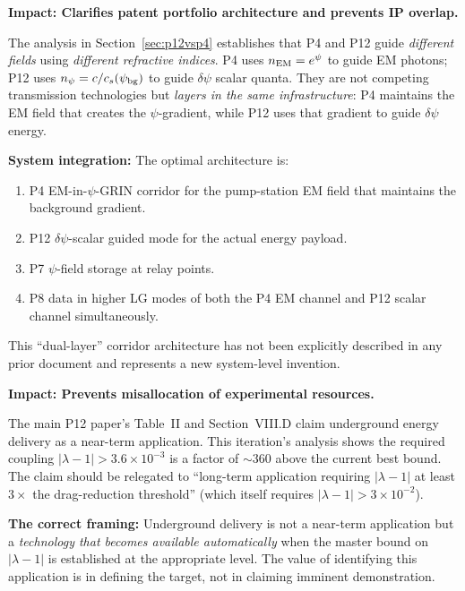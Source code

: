 \documentclass[aps,prd,twocolumn,superscriptaddress]{revtex4-2}
\newcommand{\npsi}{n_\psi}
\begin{document}
\begin{tcolorbox}[colback=red!5!white,colframe=red!75!black,title=
{Finding \#4: P12 and P4 Are Complementary, Not Competing}]
\textbf{Impact: Clarifies patent portfolio architecture and prevents IP overlap.}

The analysis in Section~\ref{sec:p12vsp4} establishes that P4 and P12
guide \emph{different fields} using \emph{different refractive indices}.
P4 uses $n_{\rm EM} = e^\psi$ to guide EM photons; P12 uses $\npsi = c/c_s(\psi_{\rm bg})$
to guide $\delta\psi$ scalar quanta.  They are not competing transmission
technologies but \emph{layers in the same infrastructure}: P4 maintains
the EM field that creates the $\psi$-gradient, while P12 uses that
gradient to guide $\delta\psi$ energy.

\textbf{System integration:}  The optimal architecture is:
\begin{enumerate}
\item P4 EM-in-$\psi$-GRIN corridor for the pump-station EM field that
maintains the background gradient.
\item P12 $\delta\psi$-scalar guided mode for the actual energy payload.
\item P7 $\psi$-field storage at relay points.
\item P8 data in higher LG modes of both the P4 EM channel and P12
scalar channel simultaneously.
\end{enumerate}

This ``dual-layer'' corridor architecture has not been explicitly described
in any prior document and represents a new system-level invention.
\end{tcolorbox}

\begin{tcolorbox}[colback=purple!5!white,colframe=purple!75!black,title=
{Finding \#5: Underground Application Error Corrected --- Threshold Much Higher}]
\textbf{Impact: Prevents misallocation of experimental resources.}

The main P12 paper's Table~II and Section~VIII.D claim underground
energy delivery as a near-term application.  This iteration's
analysis shows the required coupling $|\lambda-1| > 3.6\times10^{-3}$
is a factor of $\sim 360$ above the current best bound.  The claim
should be relegated to ``long-term application requiring $|\lambda-1|$
at least $3\times$ the drag-reduction threshold'' (which itself
requires $|\lambda-1| > 3\times10^{-2}$).

\textbf{The correct framing:} Underground delivery is not a near-term
application but a \emph{technology that becomes available
automatically} when the master bound on $|\lambda-1|$ is established
at the appropriate level.  The value of identifying this application
is in defining the target, not in claiming imminent demonstration.
\end{tcolorbox}
\end{document}
